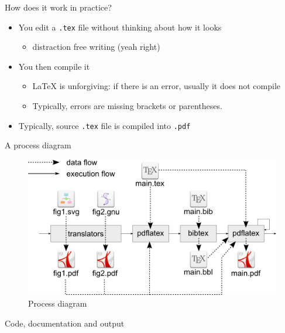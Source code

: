 \documentclass[ignorenonframetext]{beamer}
\begin{document}
{\begin{frame}[fragile]{How does it work in practice?}

\begin{itemize}
\item
  You edit a \texttt{.tex} file without thinking about how it looks

  \begin{itemize}
  \item
    distraction free writing (yeah right)
  \end{itemize}
\item
  You then compile it

  \begin{itemize}
  \item
    \LaTeX{} is unforgiving: if there is an error, usually it does not
    compile
  \item
    Typically, errors are missing brackets or parentheses.
  \end{itemize}
\item
  Typically, source \texttt{.tex} file is compiled into \texttt{.pdf}
\end{itemize}

\end{frame}

\begin{frame}{A process diagram}

\begin{figure}[htbp]
\centering
\includegraphics[width=\textwidth]{fig/process.png}
\caption{Process diagram}
\end{figure}

\end{frame}

\begin{frame}[fragile]{Code, documentation and output}


\end{frame}}
\end{document}

